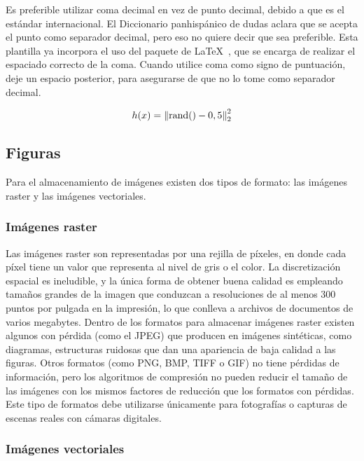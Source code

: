 Es preferible utilizar coma decimal en vez de punto decimal, debido a
que es el estándar internacional.  El Diccionario panhispánico de
dudas aclara que se acepta el punto como separador decimal, pero eso
no quiere decir que sea preferible.  Esta plantilla ya incorpora el
uso del paquete de \LaTeX\ , que se encarga de realizar
el espaciado correcto de la coma.  Cuando utilice coma como signo de
puntuación, deje un espacio posterior, para asegurarse de que
 no lo tome como separador decimal.

\begin{equation}
  \label{eq:normrnd}
  h(x)=\left\lVert\operatorname{rand}()-0,5\right\rVert^2_2
\end{equation}

\subsection{Figuras}

Para el almacenamiento de imágenes existen dos tipos de formato: las imágenes
raster y las imágenes vectoriales.

\subsubsection{Imágenes raster}

Las imágenes raster son representadas por una rejilla de píxeles, en donde cada
píxel tiene un valor que representa al nivel de gris o el color. La
discretización espacial es ineludible, y la única forma de obtener buena
calidad es empleando tamaños grandes de la imagen que conduzcan a resoluciones
de al menos 300 puntos por pulgada en la impresión, lo que conlleva a archivos
de documentos de varios megabytes. Dentro de los formatos para almacenar
imágenes raster existen algunos con pérdida (como el JPEG) que producen en
imágenes sintéticas, como diagramas, estructuras ruidosas que dan una
apariencia de baja calidad a las figuras. Otros formatos (como PNG, BMP, TIFF o
GIF) no tiene pérdidas de información, pero los algoritmos de compresión no
pueden reducir el tamaño de las imágenes con los mismos factores de reducción
que los formatos con pérdidas. Este tipo de formatos debe utilizarse únicamente
para fotografías o capturas de escenas reales con cámaras digitales.

\subsubsection{Imágenes vectoriales}


